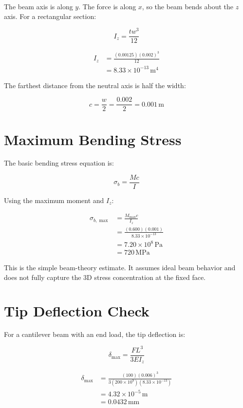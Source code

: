 \documentclass[11pt]{article}
\newcommand{\unit}[1]{\,\mathrm{#1}}
\newcommand{\MPa}{\unit{MPa}}
\begin{document}
The beam axis is along $y$. The force is along $x$, so the beam bends about the $z$ axis. For a rectangular section:

\begin{equation}
I_z = \frac{t w^3}{12}
\end{equation}

\begin{align}
I_z &= \frac{(0.00125)(0.002)^3}{12} \\
    &= 8.33\times10^{-13}\unit{m^4}
\end{align}

The farthest distance from the neutral axis is half the width:

\begin{equation}
c = \frac{w}{2}=\frac{0.002}{2}=0.001\unit{m}
\end{equation}

\section{Maximum Bending Stress}

The basic bending stress equation is:

\begin{equation}
\sigma_b = \frac{M c}{I}
\end{equation}

Using the maximum moment and $I_z$:

\begin{align}
\sigma_{b,\max} &= \frac{M_{\max}c}{I_z} \\
&= \frac{(0.600)(0.001)}{8.33\times10^{-13}} \\
&= 7.20\times10^8\unit{Pa} \\
&= 720\MPa
\end{align}

This is the simple beam-theory estimate. It assumes ideal beam behavior and does not fully capture the 3D stress concentration at the fixed face.

\section{Tip Deflection Check}

For a cantilever beam with an end load, the tip deflection is:

\begin{equation}
\delta_{\max}=\frac{F L^3}{3 E I_z}
\end{equation}

\begin{align}
\delta_{\max} &= \frac{(100)(0.006)^3}{3(200\times10^9)(8.33\times10^{-13})} \\
&= 4.32\times10^{-5}\unit{m} \\
&= 0.0432\unit{mm}
\end{align}
\end{document}
